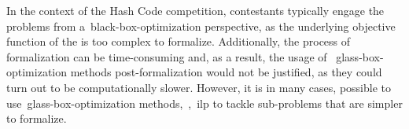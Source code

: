 In the context of the Hash Code competition, contestants typically engage the
problems from a~\acrshort{black-box-optimization} perspective, as the underlying
objective function of the is too complex to formalize. Additionally, the process
of formalization can be time-consuming and, as a result, the usage of
~\acrshort{glass-box-optimization} methods post-formalization would not be
justified, as they could turn out to be computationally slower. However, it is
in many cases, possible to use~\acrshort{glass-box-optimization}
methods,~\eg{},~\acrfull{ilp} to tackle sub-problems that are simpler to
formalize.